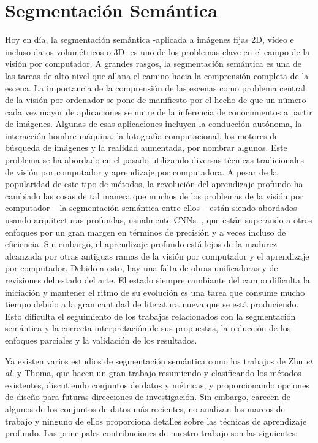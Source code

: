 \chapter{Segmentación Semántica}

Hoy en día, la segmentación semántica -aplicada a imágenes fijas 2D, vídeo e incluso datos volumétricos o 3D- es uno de los problemas clave en el campo de la visión por computador. A grandes rasgos, la segmentación semántica es una de las tareas de alto nivel que allana el camino hacia la comprensión completa de la escena. La importancia de la comprensión de las escenas como problema central de la visión por ordenador se pone de manifiesto por el hecho de que un número cada vez mayor de aplicaciones se nutre de la inferencia de conocimientos a partir de imágenes. Algunas de esas aplicaciones incluyen la conducción autónoma, la interacción hombre-máquina, la fotografía computacional, los motores de búsqueda de imágenes y la realidad aumentada, por nombrar algunos. Este problema se ha abordado en el pasado utilizando diversas técnicas tradicionales de visión por computador y aprendizaje por computadora. A pesar de la popularidad de este tipo de métodos, la revolución del aprendizaje profundo ha cambiado las cosas de tal manera que muchos de los problemas de la visión por computador -- la segmentación semántica entre ellos -- están siendo abordados usando arquitecturas profundas, usualmente \acp{CNN}. \cite{Ning2005, Ciresan2012, Farabet2013, Hariharan2014, Gupta2014}, que están superando a otros enfoques por un gran margen en términos de precisión y a veces incluso de eficiencia. Sin embargo, el aprendizaje profundo está lejos de la madurez alcanzada por otras antiguas ramas de la visión por computador y el aprendizaje por computador. Debido a esto, hay una falta de obras unificadoras y de revisiones del estado del arte. El estado siempre cambiante del campo dificulta la iniciación y mantener el ritmo de su evolución es una tarea que consume mucho tiempo debido a la gran cantidad de literatura nueva que se está produciendo. Esto dificulta el seguimiento de los trabajos relacionados con la segmentación semántica y la correcta interpretación de sus propuestas, la reducción de los enfoques parciales y la validación de los resultados.

Ya existen varios estudios de segmentación semántica como los trabajos de Zhu \emph{et al.}\cite{Zhu2016} y Thoma\cite{Thoma2016}, que hacen un gran trabajo resumiendo y clasificando los métodos existentes, discutiendo conjuntos de datos y métricas, y proporcionando opciones de diseño para futuras direcciones de investigación. Sin embargo, carecen de algunos de los conjuntos de datos más recientes, no analizan los marcos de trabajo y ninguno de ellos proporciona detalles sobre las técnicas de aprendizaje profundo. Las principales contribuciones de nuestro trabajo son las siguientes:

